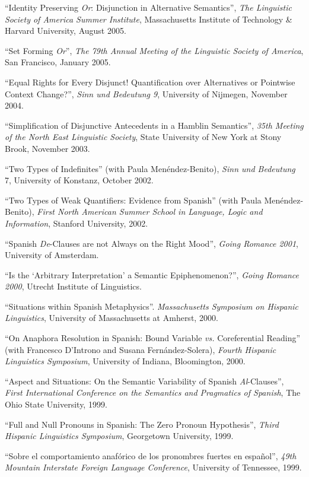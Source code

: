 \documentclass[11pt]{article}
\begin{document}
``Identity Preserving \textit{Or}: Disjunction in Alternative Semantics'', \textit{The Linguistic Society of America Summer Institute}, Massachusetts Institute of Technology \& Harvard University, August 2005. 

``Set Forming \textit{Or}'', \textit{The 79th Annual Meeting of the Linguistic Society of America}, San Francisco, January 2005. 

``Equal Rights for Every Disjunct! Quantification over Alternatives or Pointwise Context Change?'', \textit{Sinn und Bedeutung 9}, University of Nijmegen, November 2004. 

``Simplification of Disjunctive Antecedents in a Hamblin Semantics'', \textit{35th
  Meeting of the North East Linguistic Society}, State University of New York at Stony Brook, November 2003. 

``Two Types of Indefinites'' (with Paula Men\'endez-Benito), \textit{Sinn und Bedeutung} 7, University of Konstanz, October 2002. 

``Two Types of Weak Quantifiers: Evidence from Spanish'' (with Paula Men\'endez-Benito), \textit{First North American Summer School in Language, Logic and Information}, Stanford University, 2002. 

``Spanish \textit{De}-Clauses are not Always on the Right Mood'', \textit{Going Romance 2001}, University of Amsterdam. 

``Is the `Arbitrary Interpretation' a Semantic Epiphenomenon?'', \textit{Going Romance 2000}, Utrecht Institute of Linguistics.

``Situations within Spanish Metaphysics''. \textit{Massachusetts Symposium on Hispanic Linguistics}, University of Massachusetts at Amherst, 2000. 

``On Anaphora Resolution in Spanish: Bound Variable \textit{vs.} Coreferential Reading'' (with Francesco D'Introno and Susana Fern\'andez-Solera), \textit{Fourth Hispanic Linguistics Symposium}, University of Indiana, Bloomington, 2000. 

``Aspect and Situations: On the Semantic Variability of Spanish \textit{Al}-Clauses'', \textit{First International Conference on the Semantics and Pragmatics of Spanish}, The Ohio State University, 1999. 

``Full and Null Pronouns in Spanish: The Zero Pronoun Hypothesis'', \textit{Third Hispanic Linguistics Symposium}, Georgetown University, 1999. 

``Sobre el comportamiento anaf\'orico de los pronombres fuertes en espa\~nol'', \textit{49th Mountain Interstate Foreign Language Conference}, University of Tennessee, 1999. 
\end{document}
